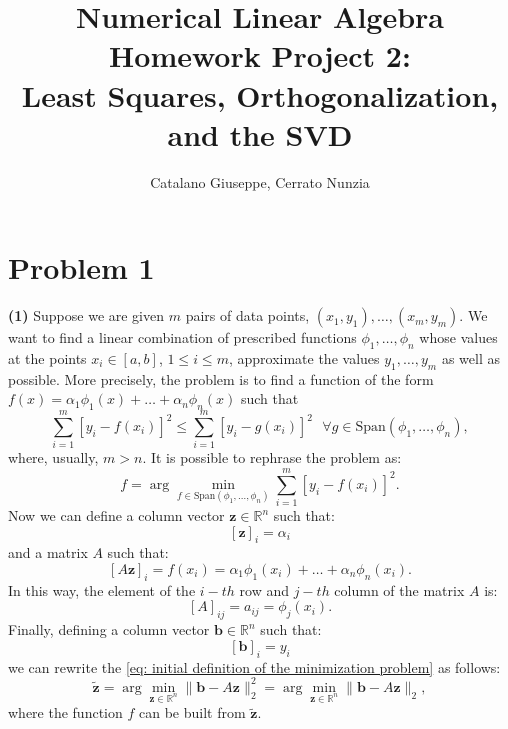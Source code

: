 \documentclass[a4paper,11pt]{article}
\newcommand{\R}{\mathbb{R}}
\begin{document}
\author{Catalano Giuseppe, Cerrato Nunzia}
\title{Numerical Linear Algebra Homework Project 2:\\Least Squares, Orthogonalization, and the SVD}
\date{}
\maketitle

\section{Problem 1}
\textbf{(1)} Suppose we are given $m$ pairs of data points, $(x_1,y_1),\dots,(x_m,y_m)$. We want to find a linear combination of prescribed functions $\phi_1, \dots, \phi_n$ whose values at the points $x_i \in [a,b] $, $1\le i \le m$, approximate the values $y_1,\dots, y_m$ as well as possible. More precisely, the problem is to find a function of the form $f(x) = \alpha_1 \phi_1(x) + \dots + \alpha_n \phi_n(x) $ such that 
\begin{equation}
	\sum_{i=1}^{m} \left[ y_i - f(x_i) \right]^2 \le \sum_{i=1}^{m} \left[ y_i - g(x_i) \right]^2\ \ \ \forall g \in \text{Span}(\phi_1,\dots,\phi_n),
\end{equation}
where, usually, $m>n$. It is possible to rephrase the problem as:
\begin{equation}\label{eq: initial definition of the minimization problem}
	f = \arg \min_{f\in \text{Span}(\phi_1,\dots,\phi_n)} \sum_{i=1}^{m} \left[ y_i - f(x_i) \right]^2.
\end{equation}
Now we can define a column vector $\textbf{z} \in \R^n$ such that:
\begin{equation}\label{key}
	[\textbf{z}]_i = \alpha_i
\end{equation}
and a matrix $A$ such that:
\begin{equation}\label{key}
	[A\textbf{z}]_i = f(x_i) = \alpha_1 \phi_1(x_i) + \dots + \alpha_n \phi_n(x_i).
\end{equation}
In this way, the element of the $i-th$ row and $j-th$ column of the matrix $A$ is:
\begin{equation}\label{key}
	[A]_{ij} = a_{ij} = \phi_j(x_i).
\end{equation}
Finally, defining a column vector $\textbf{b} \in \R^n$ such that:
\begin{equation}\label{key}
	[\textbf{b}]_i = y_i
\end{equation}
we can rewrite the \eqref{eq: initial definition of the minimization problem} as follows:
\begin{equation}\label{key}
	\tilde{\textbf{z}} = \arg \min_{\textbf{z}\in \R^n} \lVert \textbf{b} - A \textbf{z} \rVert_2^2 =  \arg \min_{\textbf{z}\in \R^n} \lVert \textbf{b} - A \textbf{z} \rVert_2,
\end{equation}
where the function $f$ can be built from $\tilde{\textbf{z}}$.
\end{document}
